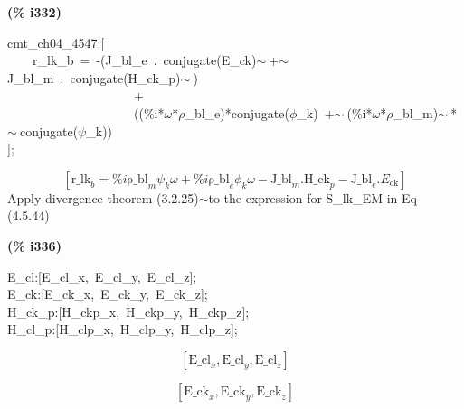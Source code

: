 \documentclass[fleqn]{article}
\begin{document}
\noindent
\begin{minipage}[t]{4.000000em}\color{red}\bfseries
(\% i332)	
\end{minipage}
\begin{minipage}[t]{\textwidth}\color{blue}
cmt\_ch04\_4547:[\\
\ \ \ \ r\_lk\_b\ =\ -(J\_bl\_e\ .\ conjugate(E\_ck)\ensuremath{\sim\ }+\ensuremath{\sim\ }J\_bl\_m\ .\ conjugate(H\_ck\_p)\ensuremath{\sim\ })\ \\
\ \ \ \ \ \ \ \ \ \ \ \ \ \ \ \ \ \ \ \ +\\
\ \ \ \ \ \ \ \ \ \ \ \ \ \ \ \ \ \ \ \ ((\%i*\ensuremath{\omega}*\ensuremath{\rho}\_bl\_e)*conjugate(\ensuremath{\phi}\_k)\ +\ensuremath{\sim\ }(\%i*\ensuremath{\omega}*\ensuremath{\rho}\_bl\_m)\ensuremath{\sim\ }*\ensuremath{\sim\ }conjugate(\ensuremath{\psi}\_k))\\
];
\end{minipage}
\[\displaystyle \tag{\% o332} 
\left[ {{\ensuremath{\mathrm{r\_ lk}}}_b}=\% i {{\ensuremath{\mathrm{\rho \_ bl}}}_m} {{\psi }_k} \omega +\% i {{\ensuremath{\mathrm{\rho \_ bl}}}_e} {{\phi }_k} \omega -{{\ensuremath{\mathrm{J\_ bl}}}_m}\ensuremath{\mathrm{ . }}{{\ensuremath{\mathrm{H\_ ck}}}_p}-{{\ensuremath{\mathrm{J\_ bl}}}_e}\ensuremath{\mathrm{ . }}{E_{\ensuremath{\mathrm{ck}}}}\right] \mbox{}
\]
Apply divergence theorem (3.2.25)\ensuremath{\sim }to the expression for S\_lk\_EM in Eq (4.5.44)


\noindent
\begin{minipage}[t]{4.000000em}\color{red}\bfseries
(\% i336)	
\end{minipage}
\begin{minipage}[t]{\textwidth}\color{blue}
E\_cl:[E\_cl\_x,\ E\_cl\_y,\ E\_cl\_z];\\
E\_ck:[E\_ck\_x,\ E\_ck\_y,\ E\_ck\_z];\\
H\_ck\_p:[H\_ckp\_x,\ H\_ckp\_y,\ H\_ckp\_z];\\
H\_cl\_p:[H\_clp\_x,\ H\_clp\_y,\ H\_clp\_z];
\end{minipage}
\[\displaystyle \tag{\% o333} 
\left[ {{\ensuremath{\mathrm{E\_ cl}}}_x}\operatorname{,}{{\ensuremath{\mathrm{E\_ cl}}}_y}\operatorname{,}{{\ensuremath{\mathrm{E\_ cl}}}_z}\right] \mbox{}\]

\[\tag{\% o334} 
\left[ {{\ensuremath{\mathrm{E\_ ck}}}_x}\operatorname{,}{{\ensuremath{\mathrm{E\_ ck}}}_y}\operatorname{,}{{\ensuremath{\mathrm{E\_ ck}}}_z}\right] \mbox{}\]
\end{document}
